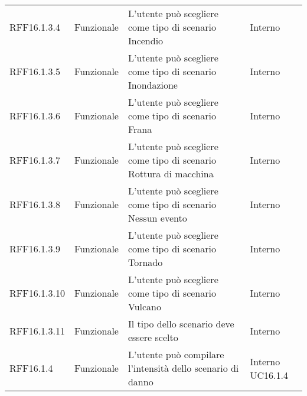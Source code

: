 \begin{longtable}{p{2cm}!{\VRule[1pt]}p{2cm}!{\VRule[1pt]}p{5cm}!{\VRule[1pt]}p{1.5cm}}
	RFF16.1.3.4                      & Funzionale\newline               & L'utente può scegliere come tipo di scenario Incendio                                                                    & Interno                      \\
	RFF16.1.3.5                      & Funzionale\newline               & L'utente può scegliere come tipo di scenario Inondazione                                                                 & Interno                      \\
	RFF16.1.3.6                      & Funzionale\newline               & L'utente può scegliere come tipo di scenario Frana                                                                       & Interno                      \\
	RFF16.1.3.7                      & Funzionale\newline               & L'utente può scegliere come tipo di scenario Rottura di macchina                                                         & Interno                      \\
	RFF16.1.3.8                      & Funzionale\newline               & L'utente può scegliere come tipo di scenario Nessun evento                                                               & Interno                      \\
	RFF16.1.3.9                      & Funzionale\newline               & L'utente può scegliere come tipo di scenario Tornado                                                                     & Interno                      \\
	RFF16.1.3.10                     & Funzionale\newline               & L'utente può scegliere come tipo di scenario Vulcano                                                                     & Interno                      \\
	RFF16.1.3.11                     & Funzionale\newline               & Il tipo dello scenario deve essere scelto                                                                                 & Interno                      \\
	RFF16.1.4                        & Funzionale\newline               & L'utente può compilare l'intensità  dello scenario di danno                                                             & Interno \newline UC16.1.4    

\end{longtable}
